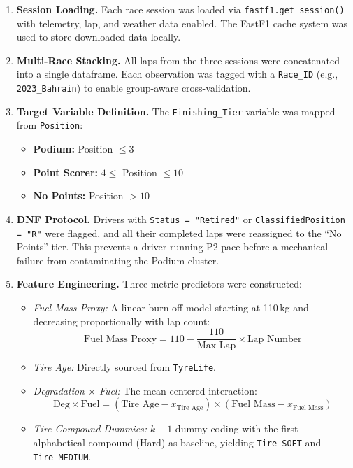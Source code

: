 \begin{enumerate}[label=Phase \arabic*:, leftmargin=*]
  \item \textbf{Session Loading.} Each race session was loaded via
    \texttt{fastf1.get\_session()} with telemetry, lap, and weather data
    enabled. The FastF1 cache system was used to store downloaded data
    locally.

  \item \textbf{Multi-Race Stacking.} All laps from the three sessions were
    concatenated into a single dataframe. Each observation was tagged with a
    \texttt{Race\_ID} (e.g., \texttt{2023\_Bahrain}) to enable group-aware
    cross-validation.

  \item \textbf{Target Variable Definition.} The \texttt{Finishing\_Tier}
    variable was mapped from \texttt{Position}:
    \begin{itemize}
      \item \textbf{Podium:} Position $\leq 3$
      \item \textbf{Point Scorer:} $4 \leq$ Position $\leq 10$
      \item \textbf{No Points:} Position $> 10$
    \end{itemize}

  \item \textbf{DNF Protocol.} Drivers with \texttt{Status = "Retired"} or
    \texttt{ClassifiedPosition = "R"} were flagged, and all their completed
    laps were reassigned to the ``No Points'' tier. This prevents a driver
    running P2 pace before a mechanical failure from contaminating the Podium
    cluster.

  \item \textbf{Feature Engineering.} Three metric predictors were constructed:
    \begin{itemize}
      \item \textit{Fuel Mass Proxy:} A linear burn-off model starting at
        110\,kg and decreasing proportionally with lap count:
        \[
          \text{Fuel Mass Proxy} = 110 - \frac{110}{\text{Max Lap}} \times
          \text{Lap Number}
        \]
      \item \textit{Tire Age:} Directly sourced from \texttt{TyreLife}.
      \item \textit{Degradation $\times$ Fuel:} The mean-centered interaction:
        \[
          \text{Deg} \times \text{Fuel} =
          (\text{Tire Age} - \bar{x}_{\text{Tire Age}}) \times
          (\text{Fuel Mass} - \bar{x}_{\text{Fuel Mass}})
        \]
      \item \textit{Tire Compound Dummies:} $k{-}1$ dummy coding with the
        first alphabetical compound (Hard) as baseline, yielding
        \texttt{Tire\_SOFT} and \texttt{Tire\_MEDIUM}.
    \end{itemize}
\end{enumerate}

